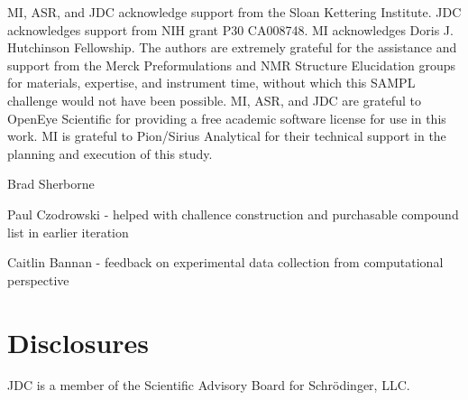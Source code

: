 \documentclass[9pt,lineno]{elife}
\begin{document}
MI, ASR, and JDC acknowledge support from the Sloan Kettering Institute.
JDC acknowledges support from NIH grant P30 CA008748. 
MI acknowledges Doris J. Hutchinson Fellowship.
The authors are extremely grateful for the assistance and support from the Merck Preformulations and NMR Structure Elucidation groups for materials, expertise, and instrument time, without which this SAMPL challenge would not have been possible.
MI, ASR, and JDC are grateful to OpenEye Scientific for providing a free academic software license for use in this work.
MI is grateful to Pion/Sirius Analytical for their technical support in the planning and execution of this study.

Brad Sherborne

Paul Czodrowski - helped with challence construction and  purchasable compound list in earlier iteration  

Caitlin Bannan - feedback on experimental data collection from computational perspective 

\section{Disclosures}

JDC is a member of the Scientific Advisory Board for Schr\"{o}dinger, LLC.

\nocite{*} %


\end{document}
